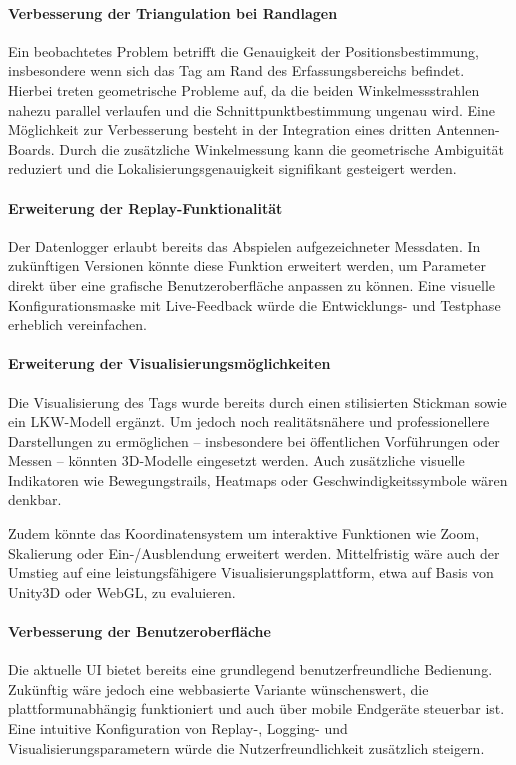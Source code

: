 \documentclass[a4paper, 12pt]{article} %
\begin{document}
\paragraph{Verbesserung der Triangulation bei Randlagen}
Ein beobachtetes Problem betrifft die Genauigkeit der Positionsbestimmung, insbesondere wenn sich das Tag am Rand des Erfassungsbereichs befindet. 
Hierbei treten geometrische Probleme auf, da die beiden Winkelmessstrahlen nahezu parallel verlaufen und die Schnittpunktbestimmung ungenau wird. 
Eine Möglichkeit zur Verbesserung besteht in der Integration eines dritten Antennen-Boards. Durch die zusätzliche Winkelmessung kann die geometrische 
Ambiguität reduziert und die Lokalisierungsgenauigkeit signifikant gesteigert werden.

\paragraph{Erweiterung der Replay-Funktionalität}
Der Datenlogger erlaubt bereits das Abspielen aufgezeichneter Messdaten. In zukünftigen Versionen könnte diese Funktion erweitert werden, um Parameter 
direkt über eine grafische Benutzeroberfläche anpassen zu können. Eine visuelle Konfigurationsmaske mit Live-Feedback würde die Entwicklungs- und 
Testphase erheblich vereinfachen.

\paragraph{Erweiterung der Visualisierungsmöglichkeiten}
Die Visualisierung des Tags wurde bereits durch einen stilisierten Stickman sowie ein LKW-Modell ergänzt. Um jedoch noch realitätsnähere und
professionellere Darstellungen zu ermöglichen – insbesondere bei öffentlichen Vorführungen oder Messen – könnten 3D-Modelle eingesetzt werden. 
Auch zusätzliche visuelle Indikatoren wie Bewegungstrails, Heatmaps oder Geschwindigkeitssymbole wären denkbar.

Zudem könnte das Koordinatensystem um interaktive Funktionen wie Zoom, Skalierung oder Ein-/Ausblendung erweitert werden. Mittelfristig wäre auch 
der Umstieg auf eine leistungsfähigere Visualisierungsplattform, etwa auf Basis von Unity3D oder WebGL, zu evaluieren.

\paragraph{Verbesserung der Benutzeroberfläche}
Die aktuelle UI bietet bereits eine grundlegend benutzerfreundliche Bedienung. Zukünftig wäre jedoch eine webbasierte Variante wünschenswert, 
die plattformunabhängig funktioniert und auch über mobile Endgeräte steuerbar ist. Eine intuitive Konfiguration von Replay-, Logging- und 
Visualisierungsparametern würde die Nutzerfreundlichkeit zusätzlich steigern.
\end{document}
